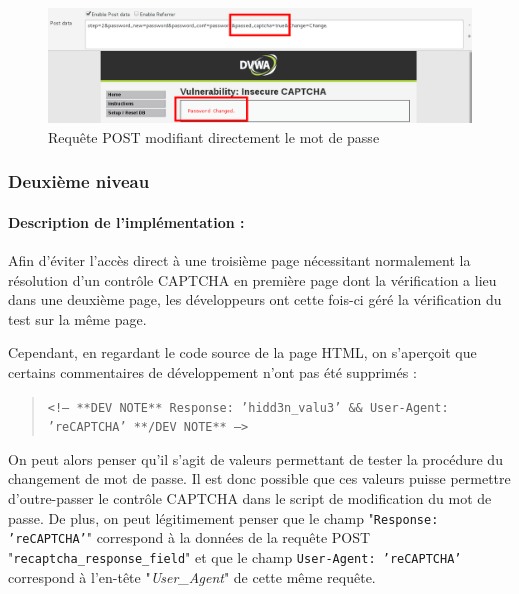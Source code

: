 \begin{figure}[!h]
\begin{center}

\includegraphics[scale=0.4]{images/captcha4_1.png}

\caption{Requête POST modifiant directement le mot de passe}
\label{captcha4}
\end{center}
\end{figure}

\subsubsection{Deuxième niveau}

\paragraph{Description de l'implémentation :}

Afin d'éviter l'accès direct à une troisième page nécessitant normalement la résolution d'un contrôle CAPTCHA en première page dont la vérification a lieu dans une deuxième page, les développeurs ont cette fois-ci géré la vérification du test sur la même page.

Cependant, en regardant le code source de la page HTML, on s'aperçoit que certains commentaires de développement n'ont pas été supprimés : 

\begin{quote}
\texttt{<!-- **DEV NOTE**   Response: 'hidd3n\_valu3'   \&\&   User-Agent: 'reCAPTCHA'   **/DEV NOTE** -->}
\end{quote}

On peut alors penser qu'il s'agit de valeurs permettant de tester la procédure du changement de mot de passe. Il est donc possible que ces valeurs puisse permettre d'outre-passer le contrôle CAPTCHA dans le script de modification du mot de passe. De plus, on peut légitimement penser que le champ "\texttt{Response: 'reCAPTCHA'}" correspond à la données de la requête POST \linebreak "\texttt{recaptcha\_response\_field}" et que le champ \texttt{User-Agent: 'reCAPTCHA'} correspond à l'en-tête "\textit{User\_Agent}" de cette même requête.

